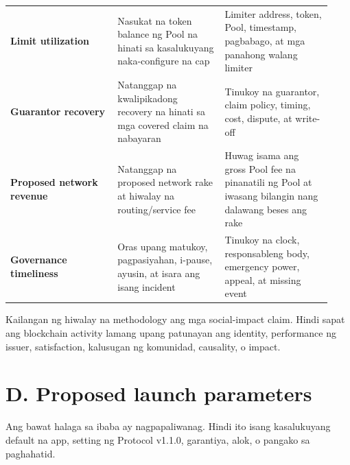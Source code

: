 \documentclass[11pt]{article}
\begin{document}
\begin{longtable}{P{0.31\linewidth} P{0.31\linewidth} P{0.31\linewidth}}
\textbf{Limit utilization} & Nasukat na token balance ng Pool na hinati sa kasalukuyang naka-configure na cap & Limiter address, token, Pool, timestamp, pagbabago, at mga panahong walang limiter \\
\textbf{Guarantor recovery} & Natanggap na kwalipikadong recovery na hinati sa mga covered claim na nabayaran & Tinukoy na guarantor, claim policy, timing, cost, dispute, at write-off \\
\textbf{Proposed network revenue} & Natanggap na proposed network rake at hiwalay na routing/service fee & Huwag isama ang gross Pool fee na pinanatili ng Pool at iwasang bilangin nang dalawang beses ang rake \\
\textbf{Governance timeliness} & Oras upang matukoy, pagpasiyahan, i-pause, ayusin, at isara ang isang incident & Tinukoy na clock, responsableng body, emergency power, appeal, at missing event \\
\bottomrule
\end{longtable}

Kailangan ng hiwalay na methodology ang mga social-impact claim. Hindi sapat ang blockchain activity lamang upang patunayan ang identity, performance ng issuer, satisfaction, kalusugan ng komunidad, causality, o impact.


\section*{D. Proposed launch parameters}

Ang bawat halaga sa ibaba ay nagpapaliwanag. Hindi ito isang kasalukuyang default na app, setting ng Protocol v1.1.0, garantiya, alok, o pangako sa paghahatid.
\end{document}
